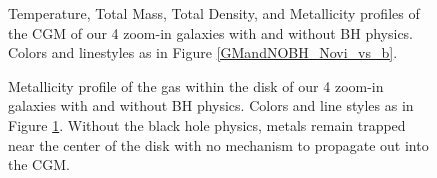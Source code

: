\documentclass[]{emulateapj}
\begin{document}
\begin{figure}
{}
\caption[]{Temperature, Total Mass, Total Density, and Metallicity profiles of the CGM of our 4 zoom-in galaxies with and without BH physics. Colors and linestyles as in Figure \ref{GMandNOBH_Novi_vs_b}.}
\label{T_M_rho_Z}
\end{figure}

\begin{figure}[h!]
\centerline{}
\caption[]{Metallicity profile of the gas within the disk of our 4 zoom-in galaxies with and without BH physics. Colors and line styles as in Figure \ref{T_M_rho_Z}. Without the black hole physics, metals remain trapped near the center of the disk with no mechanism to propagate out into the CGM.}
\label{DISK_Z}
\end{figure}
\end{document}
